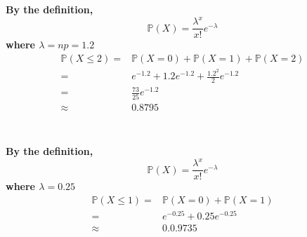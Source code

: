 \documentclass{article}
\begin{document}
    \section{}
        \paragraph{
            By the definition,
            $$\mathbb{P}(X)=\frac{\lambda^x}{x!}e^{-\lambda}$$
            where $\lambda=np=1.2$
            \begin{equation*}
                \begin{split}
                    \mathbb{P}(X\leq2)=&\mathbb{P}(X=0)+\mathbb{P}(X=1)+\mathbb{P}(X=2)\\
                        =&e^{-1.2}+1.2e^{-1.2}+\frac{1.2^2}{2}e^{-1.2}\\
                        =&\frac{73}{25}e^{-1.2}\\
                        \approx&0.8795\\
                \end{split}
            \end{equation*}
        }
    
    \section{}
        \paragraph{
            By the definition,
            $$\mathbb{P}(X)=\frac{\lambda^x}{x!}e^{-\lambda}$$
            where $\lambda=0.25$
            \begin{equation*}
                \begin{split}
                    \mathbb{P}(X\leq1)=&\mathbb{P}(X=0)+\mathbb{P}(X=1)\\
                        =&e^{-0.25}+0.25e^{-0.25}\\
                        \approx&0.0.9735\\
                \end{split}
            \end{equation*}
        }
\end{document}
